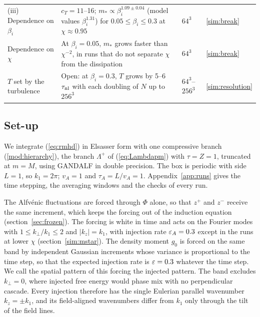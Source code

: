 \begin{table}[!ht]
\begin{tabular}{>{\raggedright\arraybackslash}p{3.1cm}>{\raggedright\arraybackslash}p{8.9cm}>{\raggedright\arraybackslash}p{1.6cm}l}
    (iii) Dependence on $\beta_i$ & $c_T=11$--16; $m_*\propto\beta_i^{1.09\pm0.04}$ (model values $\beta_i^{1.31}$) for $0.05\le\beta_i\le0.3$ at $\chi\approx0.95$ & $64^3$ & \ref{sim:break} \\
    Dependence on $\chi$ & At $\beta_i=0.05$, $m_*$ grows faster than $\chi^{-2}$, in runs that do not separate $\chi$ from the dissipation & $64^3$ & \ref{sim:break} \\
    $T$ set by the turbulence & Open: at $\beta_i=0.3$, $T$ grows by 5--6 $\tau_{\rm nl}$ with each doubling of $N$ up to $256^3$ & $64^3$--$256^3$ & \ref{sim:resolution} \\
    \bottomrule
  \end{tabular}
\end{table}

\subsection{Set-up}\label{sim:setup}

We integrate (\ref{eq:rmhd}) in Elsasser form with one compressive branch (\ref{mod:hierarchy}), the branch $\Lambda^+$ of (\ref{eq:Lambdapm}) with $\tau=Z=1$, truncated at $m=M$, using GANDALF \citep{Kanekar2025} in double precision. The box is periodic with side $L=1$, so $k_1=2\pi$; $v_A=1$ and $\tau_A=L/v_A=1$. Appendix~\ref{app:runs} gives the time stepping, the averaging windows and the checks of every run.

The Alfv\'enic fluctuations are forced through $\Phi$ alone, so that $z^+$ and $z^-$ receive the same increment, which keeps the forcing out of the induction equation (section~\ref{sec:frozen}). The forcing is white in time and acts on the Fourier modes with $1\le k_\perp/k_1\le2$ and $|k_z|=k_1$, with injection rate $\varepsilon_A=0.3$ except in the runs at lower $\chi$ (section~\ref{sim:mstar}). The density moment $g_0$ is forced on the same band by independent Gaussian increments whose variance is proportional to the time step, so that the expected injection rate is $\varepsilon=0.3$ whatever the time step. We call the spatial pattern of this forcing the injected pattern. The band excludes $k_\perp=0$, where injected free energy would phase mix with no perpendicular cascade. Every injection therefore has the single Eulerian parallel wavenumber $k_z=\pm k_1$, and its field-aligned wavenumbers differ from $k_1$ only through the tilt of the field lines.

